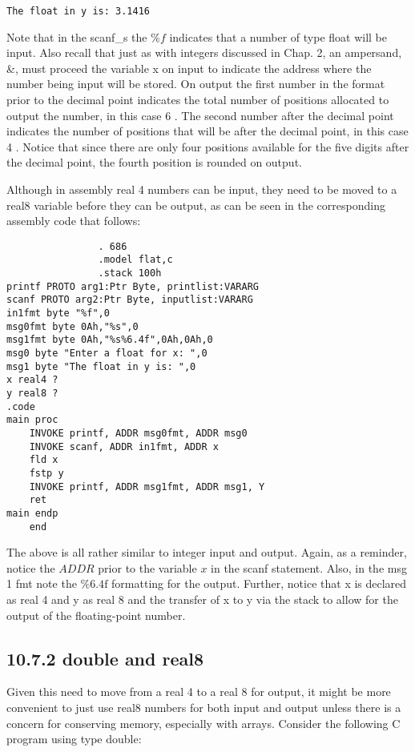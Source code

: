 \documentclass[10pt]{article}
\begin{document}
\begin{verbatim}
The float in y is: 3.1416
\end{verbatim}

Note that in the scanf\_s the $\% f$ indicates that a number of type float will be input. Also recall that just as with integers discussed in Chap. 2, an ampersand, \&, must proceed the variable x on input to indicate the address where the number being input will be stored. On output the first number in the format prior to the decimal point indicates the total number of positions allocated to output the number, in this case 6 . The second number after the decimal point indicates the number of positions that will be after the decimal point, in this case 4 . Notice that since there are only four positions available for the five digits after the decimal point, the fourth position is rounded on output.

Although in assembly real 4 numbers can be input, they need to be moved to a real8 variable before they can be output, as can be seen in the corresponding assembly code that follows:

\begin{verbatim}
                . 686
                .model flat,c
                .stack 100h
printf PROTO arg1:Ptr Byte, printlist:VARARG
scanf PROTO arg2:Ptr Byte, inputlist:VARARG
in1fmt byte "%f",0
msg0fmt byte 0Ah,"%s",0
msg1fmt byte 0Ah,"%s%6.4f",0Ah,0Ah,0
msg0 byte "Enter a float for x: ",0
msg1 byte "The float in y is: ",0
x real4 ?
y real8 ?
.code
main proc
    INVOKE printf, ADDR msg0fmt, ADDR msg0
    INVOKE scanf, ADDR in1fmt, ADDR x
    fld x
    fstp y
    INVOKE printf, ADDR msg1fmt, ADDR msg1, Y
    ret
main endp
    end
\end{verbatim}

The above is all rather similar to integer input and output. Again, as a reminder, notice the $A D D R$ prior to the variable $x$ in the scanf statement. Also, in the msg 1 fmt note the $\% 6.4 \mathrm{f}$ formatting for the output. Further, notice that x is declared as real 4 and y as real 8 and the transfer of x to y via the stack to allow for the output of the floating-point number.

\subsection*{10.7.2 double and real8}
Given this need to move from a real 4 to a real 8 for output, it might be more convenient to just use real8 numbers for both input and output unless there is a concern for conserving memory, especially with arrays. Consider the following C program using type double:
\end{document}
